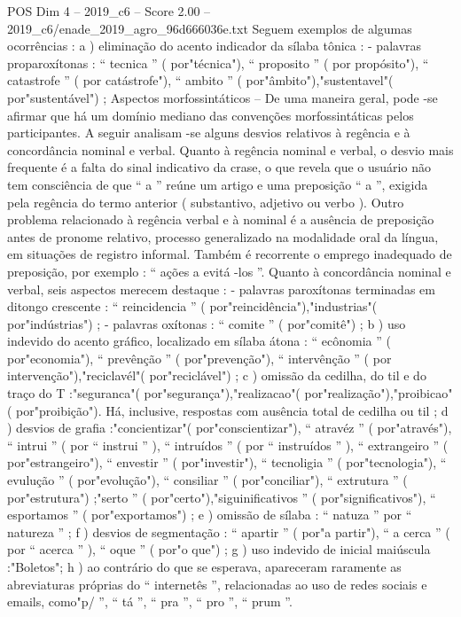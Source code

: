\begin{textsample}{POS Dim 4 – 2019\_c6 – Score 2.00 – 2019\_c6/enade\_2019\_agro\_96d666036e.txt}
Seguem exemplos de algumas ocorrências : a ) eliminação do acento indicador da sílaba tônica : - palavras proparoxítonas : “ tecnica ” ( por"técnica"), “ proposito ” ( por propósito"), “ catastrofe ” ( por catástrofe"), “ ambito ” ( por"âmbito"),"sustentavel"( por"sustentável") ; Aspectos morfossintáticos – De uma maneira geral, pode -se afirmar que há um domínio mediano das convenções morfossintáticas pelos participantes.
A seguir analisam -se alguns desvios relativos à regência e à concordância nominal e verbal.
Quanto à regência nominal e verbal, o desvio mais frequente é a falta do sinal indicativo da crase, o que revela que o usuário não tem consciência de que “ a ” reúne um artigo e uma preposição “ a ”, exigida pela regência do termo anterior ( substantivo, adjetivo ou verbo ).
Outro problema relacionado à regência verbal e à nominal é a ausência de preposição antes de pronome relativo, processo generalizado na modalidade oral da língua, em situações de registro informal.
Também é recorrente o emprego inadequado de preposição, por exemplo : “ ações a evitá -los ”.
Quanto à concordância nominal e verbal, seis aspectos merecem destaque : - palavras paroxítonas terminadas em ditongo crescente : “ reincidencia ” ( por"reincidência"),"industrias"( por"indústrias") ; - palavras oxítonas : “ comite ” ( por"comitê") ; b ) uso indevido do acento gráfico, localizado em sílaba átona : “ ecônomia ” ( por"economia"), “ prevênção ” ( por"prevenção"), “ intervênção ” ( por intervenção"),"reciclavél"( por"reciclável") ; c ) omissão da cedilha, do til e do traço do T :"seguranca"( por"segurança"),"realizacao"( por"realização"),"proibicao"( por"proibição").
Há, inclusive, respostas com ausência total de cedilha ou til ; d ) desvios de grafia :"concientizar"( por"conscientizar"), “ atravéz ” ( por"através"), “ intrui ” ( por “ instrui ” ), “ intruídos ” ( por “ instruídos ” ), “ extrangeiro ” ( por"estrangeiro"), “ envestir ” ( por"investir"), “ tecnoligia ” ( por"tecnologia"), “ evulução ” ( por"evolução"), “ consiliar ” ( por"conciliar"), “ extrutura ” ( por"estrutura") ;"serto ” ( por"certo"),"siguinificativos ” ( por"significativos"), “ esportamos ” ( por"exportamos") ; e ) omissão de sílaba : “ natuza ” por “ natureza ” ; f ) desvios de segmentação : “ apartir ” ( por"a partir"), “ a cerca ” ( por “ acerca ” ), “ oque ” ( por"o que") ; g ) uso indevido de inicial maiúscula :"Boletos"; h ) ao contrário do que se esperava, apareceram raramente as abreviaturas próprias do “ internetês ”, relacionadas ao uso de redes sociais e emails, como"p/ ”, “ tá ”, “ pra ”, “ pro ”, “ prum ”.

\end{textsample}
